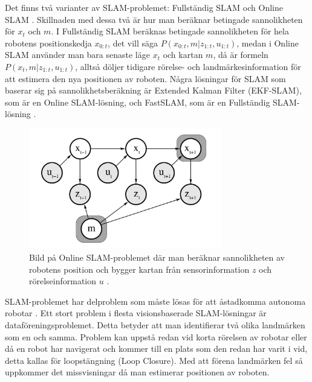 Det finns två varianter av SLAM-problemet: Fullständig SLAM och Online SLAM \citep{ProbabilisticRobotics}. Skillnaden med dessa två är hur man beräknar betingade sannolikheten för $x_t$ och $m$. I Fullständig SLAM beräknas betingade sannolikheten för hela robotens positionskedja $x_{0:t}$, det vill säga $P(x_{0:t}, m | z_{1:t}, u_{1:t})$, medan i Online SLAM använder man bara senaste läge $x_{t}$ och kartan $m$, då är formeln $P(x_t, m | z_{1:t}, u_{1:t})$, alltså döljer tidigare rörelse- och landmärkesinformation för att estimera den nya positionen av roboten. Några lösningar för SLAM som baserar sig på sannolikhetsberäkning är Extended Kalman Filter (EKF-SLAM), som är en Online SLAM-lösning, och FastSLAM, som är en Fullständig SLAM-lösning \citep{realslamproblem, ProbabilisticRobotics}. 

\begin{figure}[ht]
    \begin{center}
    \includegraphics[width=0.75\textwidth]{online-slam.JPG}
    \caption{Bild på Online SLAM-problemet där man beräknar sannolikheten av robotens position och bygger kartan från sensorinformation $z$ och rörelseinformation $u$ \citep{ProbabilisticRobotics}.}
    \label{slam-problemet}
    \end{center}
\end{figure}

SLAM-problemet har delproblem som måste lösas för att åstadkomma autonoma robotar \citep{slamproblem}. Ett stort problem i flesta visionsbaserade SLAM-lösningar är dataföreningsproblemet. Detta betyder att man identifierar två olika landmärken som en och samma. Problem kan uppstå redan vid korta rörelsen av robotar eller då en robot har navigerat och kommer till en plats som den redan har varit i vid, detta kallas för loopstängning (Loop Closure). Med att förena landmärken fel så uppkommer det missvisningar då man estimerar positionen av roboten.

